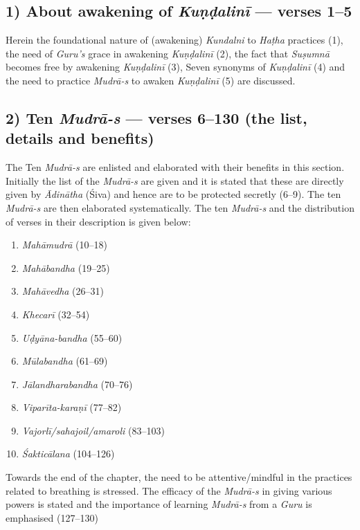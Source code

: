 \subsection*{1) About awakening of \textit{Kuṇḍalinī}  --- verses 1--5}

Herein the foundational nature of (awakening) \textit{Kundalni} to \textit{Haṭha} practices (1), the need of \textit{Guru’s} grace in awakening \textit{Kuṇḍalinī}  (2), the fact that \textit{Suṣumnā} becomes free by awakening \textit{Kuṇḍalinī}  (3), Seven synonyms of \textit{Kuṇḍalinī}  (4) and the need to practice \textit{Mudrā-s} to awaken \textit{Kuṇḍalinī}  (5) are discussed. 

\subsection*{2) Ten \textit{Mudrā-s} --- verses 6--130 (the list, details and benefits)}

The Ten \textit{Mudrā-s} are enlisted and elaborated with their benefits in this section. Initially the list of the \textit{Mudrā-s} are given and it is stated that these are directly given by \textit{Ādinātha} (Śiva) and hence are to be protected secretly (6--9). The ten \textit{Mudrā-s} are then elaborated systematically. The ten  \textit{Mudrā-s}  and the distribution of verses in their description is given below:

\begin{enumerate}
\item \textit{Mahāmudrā} (10--18)
\item \textit{Mahābandha} (19--25)
\item \textit{Mahāvedha} (26--31)
\item \textit{Khecarī} (32--54)
\item \textit{Uḍyāna-bandha} (55--60)
\item \textit{Mūlabandha} (61--69)
\item \textit{Jālandharabandha} (70--76)
\item \textit{Viparīta-karaṇī} (77--82)
\item \textit{Vajorlī/sahajoil/amaroli} (83--103)
\item \textit{Śakticālana} (104--126)
\end{enumerate}

Towards the end of the chapter, the need to be attentive/mindful in the practices related to breathing is stressed. The efficacy of the \textit{Mudrā-s} in giving various powers is stated and the importance of learning \textit{Mudrā-s} from a \textit{Guru} is emphasised (127--130) 

